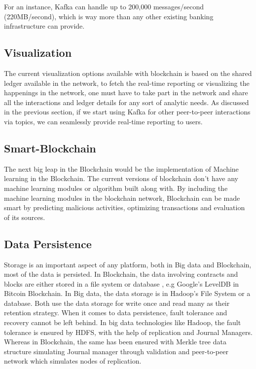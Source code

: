 \documentclass[sigconf]{acmart}
\begin{document}
For an instance, Kafka can handle up to 200,000 messages/second (220MB/second)\cite{kafka-performance}, which is way more than any other existing banking infrastructure can provide.

\subsection{Visualization}
The current visualization options available with blockchain is based on the shared ledger available in the network, to fetch the real-time reporting or visualizing the happenings in the network, one must have to take part in the network and share all the interactions and ledger details for any sort of analytic needs. As discussed in the previous section, if we start using Kafka for other peer-to-peer interactions via topics, we can seamlessly provide real-time reporting to users.

\subsection{Smart-Blockchain}
The next big leap in the Blockchain would be the implementation of Machine learning in the Blockchain. The current versions of blockchain don't have any machine learning modules or algorithm built along with. By including the machine learning modules in the blockchain network, Blockchain can be made smart by predicting malicious activities, optimizing transactions and evaluation of its sources.

\subsection{Data Persistence}
Storage is an important aspect of any platform, both in Big data and Blockchain, most of the data is persisted. In Blockchain, the data involving contracts and blocks are either stored in a file system or database \cite{Antonopoulos:2014:MBU:2695500}, e.g Google's LevelDB in Bitcoin Blockchain. In Big data, the data storage is in Hadoop's File System or a database. Both use the data storage for write once and read many as their retention strategy. When it comes to data persistence, fault tolerance and recovery cannot be left behind. In big data technologies like Hadoop, the fault tolerance is ensured by HDFS, with the help of replication and Journal Managers. Whereas in Blockchain, the same has been ensured with Merkle tree data structure simulating Journal manager through validation and peer-to-peer network which simulates nodes of replication. 
\end{document}
